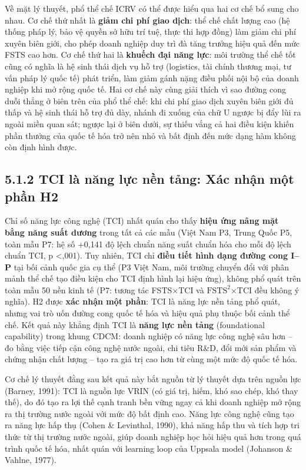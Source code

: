 \documentclass[
  a4paper,
  13pt]{extreport}
\begin{document}
Về mặt lý thuyết, phổ thể chế ICRV có thể được hiểu qua hai cơ chế bổ
sung cho nhau. Cơ chế thứ nhất là \textbf{giảm chi phí giao dịch}: thể
chế chất lượng cao (hệ thống pháp lý, bảo vệ quyền sở hữu trí tuệ, thực
thi hợp đồng) làm giảm chi phí xuyên biên giới, cho phép doanh nghiệp
duy trì đà tăng trưởng hiệu quả đến mức FSTS cao hơn. Cơ chế thứ hai là
\textbf{khuếch đại năng lực}: môi trường thể chế tốt cũng có nghĩa là hệ
sinh thái dịch vụ hỗ trợ (logistics, tài chính thương mại, tư vấn pháp
lý quốc tế) phát triển, làm giảm gánh nặng điều phối nội bộ của doanh
nghiệp khi mở rộng quốc tế. Hai cơ chế này cùng giải thích vì sao đường
cong duỗi thẳng ở biên trên của phổ thể chế: khi chi phí giao dịch xuyên
biên giới đủ thấp và hệ sinh thái hỗ trợ đủ dày, nhánh đi xuống của chữ
U ngược bị đẩy lùi ra ngoài miền quan sát; ngược lại ở biên dưới, sự
thiếu vắng cả hai điều kiện khiến phần thưởng của quốc tế hóa trở nên
nhỏ và bất định đến mức dạng hàm không còn định hình được.

\hypertarget{tci-luxe0-nux103ng-lux1ef1c-nux1ec1n-tux1ea3ng-xuxe1c-nhux1eadn-mux1ed9t-phux1ea7n-h2}{%
\subsection{5.1.2 TCI là năng lực nền tảng: Xác nhận một phần
H2}\label{tci-luxe0-nux103ng-lux1ef1c-nux1ec1n-tux1ea3ng-xuxe1c-nhux1eadn-mux1ed9t-phux1ea7n-h2}}

Chỉ số năng lực công nghệ (TCI) nhất quán cho thấy \textbf{hiệu ứng nâng
mặt bằng năng suất dương} trong tất cả các mẫu (Việt Nam P3, Trung Quốc
P5, toàn mẫu P7: hệ số +0,141 độ lệch chuẩn năng suất chuẩn hóa cho mỗi
độ lệch chuẩn TCI, p \textless,001). Tuy nhiên, TCI chỉ \textbf{điều
tiết hình dạng đường cong I--P} tại bối cảnh quốc gia cụ thể (P3 Việt
Nam, môi trường chuyển đổi với phân mảnh thể chế tạo điều kiện cho TCI
định hình lại hiệu ứng), không phổ quát trên toàn mẫu 50 nền kinh tế
(P7: tương tác FSTS×TCI và \(\text{FSTS}^2\)×TCI đều không ý nghĩa). H2
được \textbf{xác nhận một phần}: TCI là năng lực nền tảng phổ quát,
nhưng vai trò uốn đường cong quốc tế hóa và hiệu quả phụ thuộc bối cảnh
thể chế. Kết quả này khẳng định TCI là \textbf{năng lực nền tảng}
(foundational capability) trong khung CDCM: doanh nghiệp có năng lực
công nghệ sâu hơn -- đo bằng việc tiếp cận công nghệ nước ngoài, chi
tiêu R\&D, đổi mới sản phẩm và chứng nhận chất lượng -- tạo ra giá trị
cao hơn từ cùng một mức độ quốc tế hóa.

Cơ chế lý thuyết đằng sau kết quả này bắt nguồn từ lý thuyết dựa trên
nguồn lực (Barney, 1991): TCI là nguồn lực VRIN (có giá trị, hiếm, khó
sao chép, khó thay thế), do đó tạo ra lợi thế cạnh tranh bền vững ngay
cả khi doanh nghiệp mở rộng ra thị trường nước ngoài với mức độ bất định
cao. Năng lực công nghệ cũng tạo ra năng lực hấp thụ (Cohen \&
Levinthal, 1990), khả năng hấp thu và tích hợp tri thức từ thị trường
nước ngoài, giúp doanh nghiệp học hỏi hiệu quả hơn trong quá trình quốc
tế hóa, nhất quán với learning loop của Uppsala model (Johanson \&
Vahlne, 1977).
\end{document}
